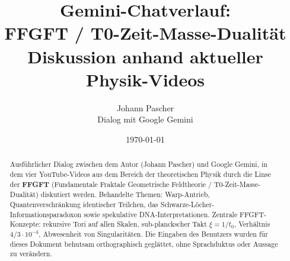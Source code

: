\documentclass[11pt,a4paper]{article}
\title{Gemini-Chatverlauf:\\[0.4em]
\large FFGFT / T0-Zeit-Masse-Dualität\\
\normalsize Diskussion anhand aktueller Physik-Videos}
\author{Johann Pascher\\[0.3em]
\small Dialog mit Google Gemini}
\date{\today}
\begin{document}
\maketitle

\begin{abstract}
\noindent
Ausführlicher Dialog zwischen dem Autor (Johann Pascher) und Google
Gemini, in dem vier YouTube-Videos aus dem Bereich der theoretischen
Physik durch die Linse der \textbf{FFGFT} (Fundamentale Fraktale
Geometrische Feldtheorie / T0-Zeit-Masse-Dualität) diskutiert werden.
Behandelte Themen: Warp-Antrieb, Quantenverschränkung identischer
Teilchen, das Schwarze-Löcher-Informationsparadoxon sowie spekulative
DNA-Interpretationen. Zentrale FFGFT-Konzepte: rekursive Tori auf allen
Skalen, sub-planckscher Takt $\xi = 1/t_0$, Verhältnis
$4/3 \cdot 10^{-4}$, Abwesenheit von Singularitäten.
Die Eingaben des Benutzers wurden für dieses Dokument behutsam
orthographisch geglättet, ohne Sprachduktus oder Aussage zu verändern.
\end{abstract}

\tableofcontents
\bigskip


\end{document}
